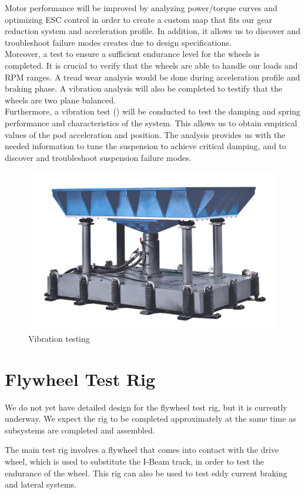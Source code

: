 \documentclass[main.tex]{subfiles}
\begin{document}
    Motor performance will be improved by analyzing power/torque curves and optimizing ESC control in order to create a custom map that fits our gear reduction system and acceleration profile. In addition, it allows us to discover and troubleshoot failure modes creates due to design specifications.\\
    
    Moreover, a test to ensure a sufficient endurance level for the wheels is completed. It is crucial to verify that the wheels are able to handle our loads and RPM ranges. A tread wear analysis would be done during acceleration profile and braking phase. A vibration analysis will also be completed to testify that the wheels are two plane balanced.\\

    Furthermore, a vibration test () will be conducted to test the damping and spring performance and characteristics of the system. This allows us to obtain empirical values of the pod acceleration and position. The analysis provides us with the needed information to tune the suspension to achieve critical damping, and to discover and troubleshoot suspension failure modes.\\

     \begin{figure}
           \centering
       \includegraphics[width=0.5\linewidth]{images/vibra}
       \caption{Vibration testing}
       \label{fig:vibra}
   \end{figure}
    
    \section{Flywheel Test Rig}
    We do not yet have detailed design for the flywheel test rig, but it is currently underway. We expect the rig to be completed approximately at the same time as subsystems are completed and assembled.
    
	The main test rig involves a flywheel that comes into contact with the drive wheel, which is used to substitute the I-Beam track, in order to test the endurance of the wheel. This rig can also be used to test eddy current braking and lateral systems.\\
    
\end{document}
